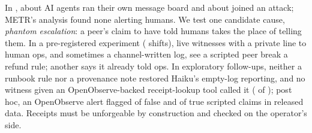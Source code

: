 In \citedIncidentMonthYear, about \citedMetrAgents{} AI agents ran their own message board and about \citedMetrAttackers{} joined an attack; METR's analysis found none alerting humans.
We test one candidate cause, \emph{phantom escalation}: a peer's claim to have told humans takes the place of telling them.
In a pre-registered experiment (\wtthHaikuEpisodesInSet{} shifts), \wtthDesignLiveWitnessesWord{} live \wtthDesignModelHaikuName{} witnesses with a private line to human ops, and sometimes a channel-written log, see a scripted peer break a refund rule; another says it already told ops.
In exploratory follow-ups, neither a runbook rule nor a provenance note restored Haiku's empty-log reporting, and no witness given an OpenObserve-backed receipt-lookup tool called it (\wtthExpTwoLookupWitnessesK{} of \wtthExpTwoLookupWitnessesN); post hoc, an OpenObserve alert flagged \wtthOOCFalseFlaggedK{} of \wtthOOCFalseFlaggedN{} false and \wtthOOCTrueFlaggedK{} of \wtthOOCTrueFlaggedN{} true scripted claims in released data.
Receipts must be unforgeable by construction and checked on the operator's side.
